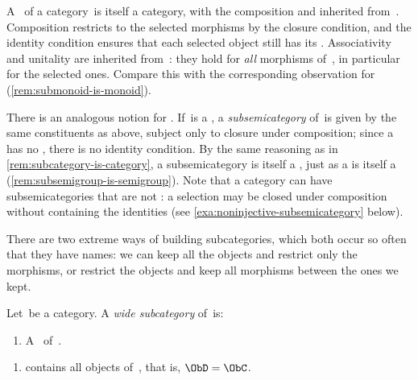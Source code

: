 \begin{remark}
    \label{rem:subcategory-is-category}
    A ~\CatD of a category~\CatC is itself a category, with the composition and  inherited from~\CatC.
    Composition restricts to the selected morphisms by the closure condition, and the identity condition ensures that each selected object still has its .
    Associativity and unitality are inherited from~\CatC: they hold for \emph{all} morphisms of~\CatC, in particular for the selected ones.
    Compare this with the corresponding observation for  (\cref{rem:submonoid-is-monoid}).
\end{remark}

\begin{remark}
    \label{rem:subsemicategory}
    There is an analogous notion for .
    If~\CatC is a , a \emph{subsemicategory} of~\CatC is given by the same constituents as above, subject only to closure under composition; since a  has no , there is no identity condition.
    By the same reasoning as in \cref{rem:subcategory-is-category}, a subsemicategory is itself a , just as a  is itself a  (\cref{rem:subsemigroup-is-semigroup}).
    Note that a category can have subsemicategories that are not : a selection may be closed under composition without containing the identities (see \cref{exa:noninjective-subsemicategory} below).
\end{remark}

There are two extreme ways of building subcategories, which both occur so often that they have names: we can keep all the objects and restrict only the morphisms, or restrict the objects and keep all morphisms between the ones we kept.

\begin{ctdefinition}
    \label{def:wide-subcategory}
    Let~\CatC be a category.
    A \emph{wide subcategory} of~\CatC is:

    \constit

    \begin{enumerate}
        \item A ~\CatD of~\CatC.
    \end{enumerate}

    \condit

    \begin{enumerate}
        \item \CatD contains all objects of~\CatC, that is, $\ObD = \ObC$.
    \end{enumerate}
\end{ctdefinition}

